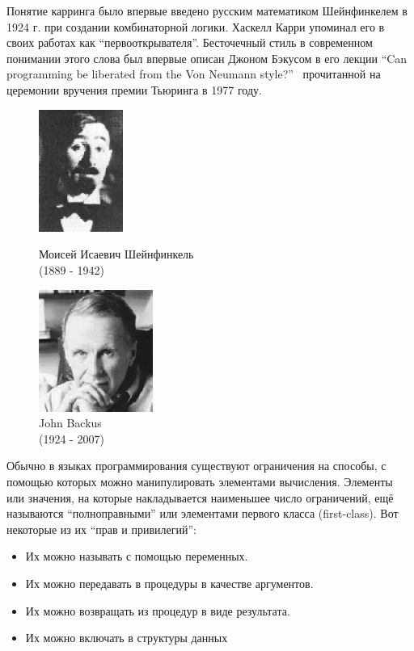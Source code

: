 \documentclass[a4paper,11pt]{article}
\begin{document}
Понятие карринга было впервые введено русским математиком Шейнфинкелем в
1924 г. при создании комбинаторной логики. Хаскелл Карри упоминал его в своих 
работах как ``первооткрывателя''. Бесточечный стиль в современном понимании
этого слова был впервые описан Джоном Бэкусом в его лекции ``Can programming
be liberated from the Von Neumann style?''~\cite{Backus} прочитанной на
церемонии вручения премии Тьюринга в 1977 году. 
\begin{figure}[h]
  \begin{minipage}[h]{0.49\linewidth}
    \begin{center}
        \includegraphics[height=40mm]{lecture3/schonfinkel.eps}
        \caption{Моисей Исаевич Шейнфинкель\\(1889 - 1942)}
    \end{center}
  \end{minipage}
  \begin{minipage}[h]{0.49\linewidth}
    \begin{center}
      \includegraphics[height=40mm]{lecture3/backus.eps}
      \caption{John Backus\\(1924 - 2007)}
    \end{center}
  \end{minipage}
\end{figure}

Обычно в языках программирования существуют ограничения на способы, с помощью
которых можно манипулировать элементами вычисления. Элементы или значения, на
которые накладывается наименьшее число ограничений, ещё называются
``полноправными'' или элементами первого класса (first-class). Вот некоторые из
их ``прав и  привилегий'':
\begin{itemize}
\item Их можно называть с помощью переменных.
\item Их можно передавать в процедуры в качестве аргументов.
\item Их можно возвращать из процедур в виде результата.
\item Их можно включать в структуры данных
\end{itemize}
\nocite{*}


\end{document}
